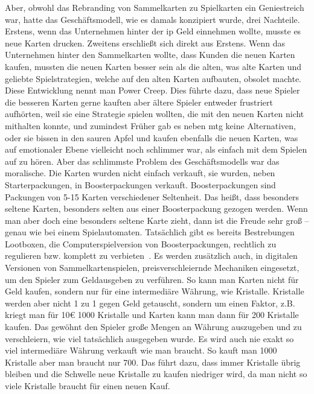 \documentclass[fontsize=11, a4aper]{scrartcl}
\begin{document}
\noindent Aber, obwohl das Rebranding von Sammelkarten zu Spielkarten ein Geniestreich war, hatte das Geschäftsmodell, wie es damals konzipiert wurde, drei Nachteile. Erstens, wenn das Unternehmen hinter der \ac{ip} Geld einnehmen wollte, musste es neue Karten drucken. Zweitens erschließt sich direkt aus Erstens. Wenn das Unternehmen hinter den Sammelkarten wollte, dass Kunden die neuen Karten kaufen, mussten die neuen Karten besser sein als die alten, was alte Karten und geliebte Spielstrategien, welche auf den alten Karten aufbauten, obsolet machte. Diese Entwicklung nennt man \glqq Power Creep\grqq. Dies führte dazu, dass neue Spieler die besseren Karten gerne kauften aber ältere Spieler entweder frustriert aufhörten, weil sie eine Strategie spielen wollten, die mit den neuen Karten nicht mithalten konnte, und zumindest Früher gab es neben \ac{mtg} keine Alternativen, oder sie bissen in den sauren Apfel und kaufen ebenfalls die neuen Karten, was auf emotionaler Ebene vielleicht noch schlimmer war, als einfach mit dem Spielen auf zu hören. Aber das schlimmste Problem des Geschäftsmodells war das moralische. Die Karten wurden nicht einfach verkauft, sie wurden, neben Starterpackungen, in Boosterpackungen verkauft. Boosterpackungen sind Packungen von 5-15 Karten verschiedener Seltenheit. Das heißt, dass besonders seltene Karten, besonders selten aus einer Boosterpackung gezogen werden. Wenn man aber doch eine besonders seltene Karte zieht, dann ist die Freude sehr groß -- genau wie bei einem Spielautomaten. Tatsächlich gibt es bereits Bestrebungen Lootboxen, die Computerspielversion von Boosterpackungen, rechtlich zu regulieren bzw. komplett zu verbieten~\cite{Rechtliche_Situation_bzgl_Lootboxen}. Es werden zusätzlich auch, in digitalen Versionen von Sammelkartenspielen, preisverschleiernde Mechaniken eingesetzt, um den Spieler zum Geldausgeben zu verführen. So kann man Karten nicht für Geld kaufen, sondern nur für eine intermediäre Währung, wie Kristalle. Kristalle werden aber nicht 1 zu 1 gegen Geld getauscht, sondern um einen Faktor, z.B. kriegt man für 10€ 1000 Kristalle und Karten kann man dann für 200 Kristalle kaufen. Das gewöhnt den Spieler große Mengen an Währung auszugeben und zu verschleiern, wie viel tatsächlich ausgegeben wurde. Es wird auch nie exakt so viel intermediäre Währung verkauft wie man braucht. So kauft man 1000 Kristalle aber man braucht nur 700. Das führt dazu, dass immer Kristalle übrig bleiben und die Schwelle neue Kristalle zu kaufen niedriger wird, da man nicht so viele Kristalle braucht für einen neuen Kauf.\hfill\newline
\end{document}
